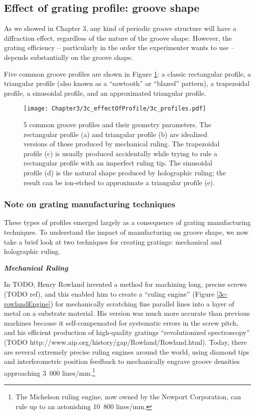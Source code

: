 \subsection{Effect of grating profile: groove shape}

As we showed in Chapter 3, any kind of periodic groove structure will have a diffraction effect, regardless of the nature of the groove shape.  However, the grating efficiency -- particularly in the order the experimenter wants to use -- depends substantially on the groove shape.  

Five common groove profiles are shown in Figure \ref{3c-profile}: a classic rectangular profile, a triangular profile (also known as a ``sawtooth'' or ``blazed'' pattern), a trapezoidal profile, a sinusoidal profile, and an approximated triangular profile.

\begin{figure}[htbp] %
   \centering
   \texttt{[image: Chapter3/3c\_effectOfProfile/3c\_profiles.pdf]}
   \caption[5 common groove profiles and their geometry parameters.]{5 common groove profiles and their geometry parameters.  The rectangular profile (a) and triangular profile (b) are idealized versions of those produced by mechanical ruling.  The trapezoidal profile (c) is usually produced accidentally while trying to rule a rectangular profile with an imperfect ruling tip.  The sinusoidal profile (d) is the natural shape produced by holographic ruling; the result can be ion-etched to approximate a triangular profile (e).}
   \label{3c-profile}
\end{figure}

\subsubsection{Note on grating manufacturing techniques}
\label{gratingManufacturing}
These types of profiles emerged largely as a consequence of grating manufacturing techniques.  To understand the impact of manufacturing on groove shape, we now take a brief look at two techniques for creating gratings: mechanical and holographic ruling.

\noindent \textbf{\emph{Mechanical Ruling}}

\noindent In TODO, Henry Rowland invented a method for machining long, precise screws (TODO ref), and this enabled him to create a ``ruling engine'' (Figure \ref{3c-rowlandEngine}) for mechanically scratching fine parallel lines into a layer of metal on a substrate material.  His version was much more accurate than previous machines because it self-compensated for systematic errors in the screw pitch, and his efficient production of high-quality gratings ``revolutionized spectroscopy'' (TODO http://www.aip.org/history/gap/Rowland/Rowland.html).  Today, there are several extremely precise ruling engines around the world, using diamond tips and interferometric position feedback to mechanically engrave groove densities approaching 3~000 lines/mm.\footnote{The Michelson ruling engine, now owned by the Newport Corporation, can rule up to an astonishing 10~800 lines/mm.}

